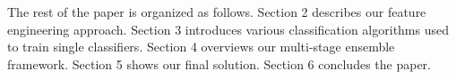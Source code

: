 The rest of the paper is organized as follows. Section 2 describes our feature engineering approach. Section 3 introduces various classification algorithms used to train single classifiers. Section 4 overviews our multi-stage ensemble framework. Section 5 shows our final solution. Section 6 concludes the paper.

